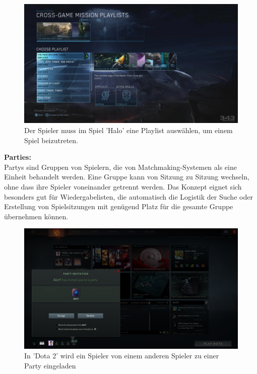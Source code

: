 \begin{figure}[H]
	\centering
	\includegraphics[width=120mm]{images/halo_playlist.png}
	\caption['Halo' Playlist]{Der Spieler muss im Spiel 'Halo' eine Playlist auswählen, um einem Spiel beizutreten.}
	\label{pic:halo_playlist}
\end{figure}

\cite{Wikipedia.2021b}

\textbf{Parties:} \\
Partys sind Gruppen von Spielern, die von Matchmaking-Systemen als eine Einheit behandelt werden. Eine Gruppe kann von Sitzung zu Sitzung wechseln, ohne dass ihre Spieler voneinander getrennt werden. Das Konzept eignet sich besonders gut für Wiedergabelisten, die automatisch die Logistik der Suche oder Erstellung von Spielsitzungen mit genügend Platz für die gesamte Gruppe übernehmen können.

\begin{figure}[H]
	\centering
	\includegraphics[width=120mm]{images/Dota2_Party_Invite.png}
	\caption['Dota 2' Party]{In 'Dota 2' wird ein Spieler von einem anderen Spieler zu einer Party eingeladen}
	\label{pic:Dota2_Party_Invite}
\end{figure}

\cite{Wikipedia.2021b} 

